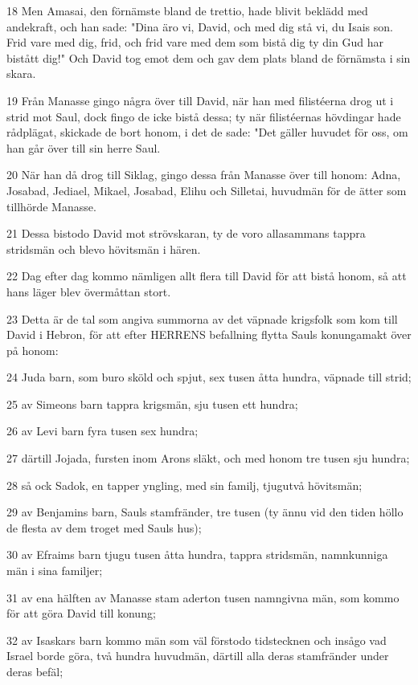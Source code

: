 \par 18 Men Amasai, den förnämste bland de trettio, hade blivit beklädd med andekraft, och han sade: "Dina äro vi, David, och med dig stå vi, du Isais son. Frid vare med dig, frid, och frid vare med dem som bistå dig ty din Gud har bistått dig!" Och David tog emot dem och gav dem plats bland de förnämsta i sin skara.
\par 19 Från Manasse gingo några över till David, när han med filistéerna drog ut i strid mot Saul, dock fingo de icke bistå dessa; ty när filistéernas hövdingar hade rådplägat, skickade de bort honom, i det de sade: "Det gäller huvudet för oss, om han går över till sin herre Saul.
\par 20 När han då drog till Siklag, gingo dessa från Manasse över till honom: Adna, Josabad, Jediael, Mikael, Josabad, Elihu och Silletai, huvudmän för de ätter som tillhörde Manasse.
\par 21 Dessa bistodo David mot strövskaran, ty de voro allasammans tappra stridsmän och blevo hövitsmän i hären.
\par 22 Dag efter dag kommo nämligen allt flera till David för att bistå honom, så att hans läger blev övermåttan stort.
\par 23 Detta är de tal som angiva summorna av det väpnade krigsfolk som kom till David i Hebron, för att efter HERRENS befallning flytta Sauls konungamakt över på honom:
\par 24 Juda barn, som buro sköld och spjut, sex tusen åtta hundra, väpnade till strid;
\par 25 av Simeons barn tappra krigsmän, sju tusen ett hundra;
\par 26 av Levi barn fyra tusen sex hundra;
\par 27 därtill Jojada, fursten inom Arons släkt, och med honom tre tusen sju hundra;
\par 28 så ock Sadok, en tapper yngling, med sin familj, tjugutvå hövitsmän;
\par 29 av Benjamins barn, Sauls stamfränder, tre tusen (ty ännu vid den tiden höllo de flesta av dem troget med Sauls hus);
\par 30 av Efraims barn tjugu tusen åtta hundra, tappra stridsmän, namnkunniga män i sina familjer;
\par 31 av ena hälften av Manasse stam aderton tusen namngivna män, som kommo för att göra David till konung;
\par 32 av Isaskars barn kommo män som väl förstodo tidstecknen och insågo vad Israel borde göra, två hundra huvudmän, därtill alla deras stamfränder under deras befäl;
